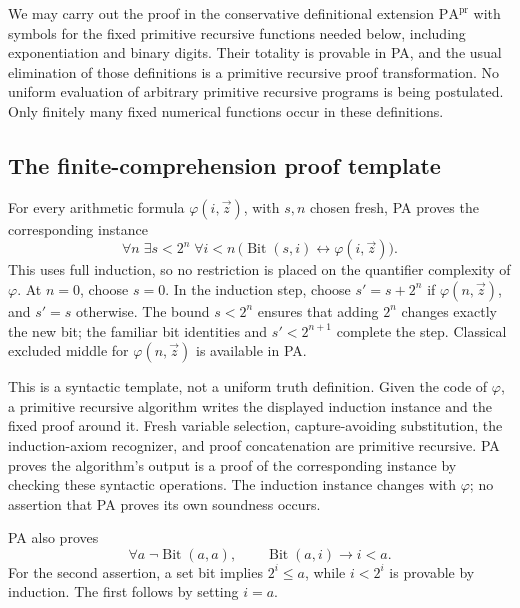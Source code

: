 We may carry out the proof in the conservative definitional extension
$\mathrm{PA}^{\mathrm{pr}}$ with symbols for the fixed primitive recursive
functions needed below, including exponentiation and binary digits.
Their totality is provable in PA, and the usual elimination of those
definitions is a primitive recursive proof transformation. No uniform
evaluation of arbitrary primitive recursive programs is being postulated.
Only finitely many fixed numerical functions occur in these definitions.

\subsection{The finite-comprehension proof template}

For every arithmetic formula $\varphi(i,\vec z)$, with $s,n$ chosen fresh,
PA proves the corresponding instance
\begin{equation}\label{eq:finite-comprehension-template}
 \forall n\;\exists s<2^n\;\forall i<n\,
 \bigl(\operatorname{Bit}(s,i)\leftrightarrow\varphi(i,\vec z)\bigr).
\end{equation}
This uses full induction, so no restriction is placed on the quantifier
complexity of $\varphi$. At $n=0$, choose $s=0$. In the induction step,
choose $s'=s+2^n$ if $\varphi(n,\vec z)$, and $s'=s$ otherwise.
The bound $s<2^n$ ensures that adding $2^n$ changes exactly the new bit;
the familiar bit identities and $s'<2^{n+1}$ complete the step. Classical
excluded middle for $\varphi(n,\vec z)$ is available in PA.

This is a syntactic template, not a uniform truth definition. Given the
code of $\varphi$, a primitive recursive algorithm writes the displayed
induction instance and the fixed proof around it. Fresh variable selection,
capture-avoiding substitution, the induction-axiom recognizer, and proof
concatenation are primitive recursive. PA proves the algorithm's output is
a proof of the corresponding instance by checking these syntactic
operations. The induction instance changes with $\varphi$; no assertion
that PA proves its own soundness occurs.

PA also proves
\begin{equation}\label{eq:no-self-bit}
 \forall a\;\neg\operatorname{Bit}(a,a),
 \qquad
 \operatorname{Bit}(a,i)\longrightarrow i<a.
\end{equation}
For the second assertion, a set bit implies $2^i\le a$, while
$i<2^i$ is provable by induction. The first follows by setting $i=a$.

